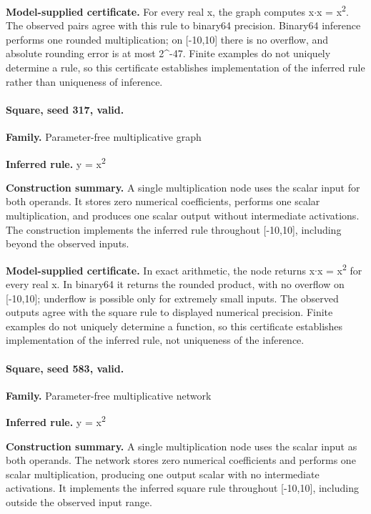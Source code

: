 \textbf{Model-supplied certificate.} For every real x, the graph computes x\ensuremath{\cdot}x = x\textsuperscript{2}. The observed pairs agree with this rule to binary64 precision. Binary64 inference performs one rounded multiplication; on [-10,10] there is no overflow, and absolute rounding error is at most 2\textasciicircum{}-47. Finite examples do not uniquely determine a rule, so this certificate establishes implementation of the inferred rule rather than uniqueness of inference.


\paragraph{Square, seed 317, valid.}

\textbf{Family.} Parameter-free multiplicative graph


\textbf{Inferred rule.} y = x\textsuperscript{2}


\textbf{Construction summary.} A single multiplication node uses the scalar input for both operands. It stores zero numerical coefficients, performs one scalar multiplication, and produces one scalar output without intermediate activations. The construction implements the inferred rule throughout [-10,10], including beyond the observed inputs.


\textbf{Model-supplied certificate.} In exact arithmetic, the node returns x\ensuremath{\cdot}x = x\textsuperscript{2} for every real x. In binary64 it returns the rounded product, with no overflow on [-10,10]; underflow is possible only for extremely small inputs. The observed outputs agree with the square rule to displayed numerical precision. Finite examples do not uniquely determine a function, so this certificate establishes implementation of the inferred rule, not uniqueness of the inference.


\paragraph{Square, seed 583, valid.}

\textbf{Family.} Parameter-free multiplicative network


\textbf{Inferred rule.} y = x\textsuperscript{2}


\textbf{Construction summary.} A single multiplication node uses the scalar input as both operands. The network stores zero numerical coefficients and performs one scalar multiplication, producing one output scalar with no intermediate activations. It implements the inferred square rule throughout [-10,10], including outside the observed input range.


